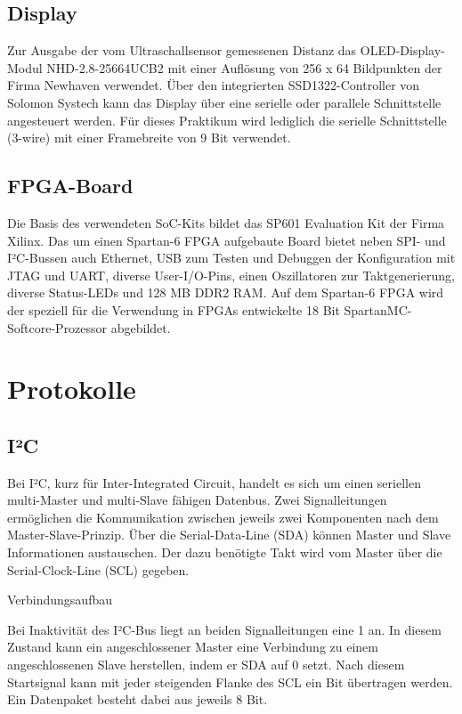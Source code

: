 \documentclass[parskip,
							 oneside,
							 11pt,
							 noheadingspace,
							 accentcolor=tud1d,
							 bigchapter,
							 colorback]{tudreport}
\begin{document}
\section{Display}
Zur Ausgabe der vom Ultraschallsensor gemessenen Distanz das OLED-Display-Modul NHD-2.8-25664UCB2 mit einer Auflösung von 256 x 64 Bildpunkten der Firma Newhaven verwendet. Über den integrierten SSD1322-Controller von Solomon Systech kann das Display über eine serielle oder parallele Schnittstelle angesteuert werden.  
Für dieses Praktikum wird lediglich die serielle Schnittstelle (3-wire) mit einer Framebreite von 9 Bit verwendet.

	\section{FPGA-Board}
Die Basis des verwendeten SoC-Kits bildet das SP601 Evaluation Kit der Firma Xilinx. Das um einen Spartan-6 FPGA aufgebaute Board bietet neben SPI- und I²C-Bussen auch Ethernet, USB zum Testen und Debuggen der Konfiguration mit JTAG und UART, diverse User-I/O-Pins, einen Oszillatoren zur Taktgenerierung, diverse Status-LEDs und 128 MB DDR2 RAM.
Auf dem Spartan-6 FPGA wird der speziell für die Verwendung in FPGAs entwickelte 18 Bit SpartanMC-Softcore-Prozessor abgebildet. 

\chapter{Protokolle}
\section{I²C}
Bei I²C, kurz für Inter-Integrated Circuit, handelt es sich um einen seriellen multi-Master und multi-Slave fähigen Datenbus. Zwei Signalleitungen ermöglichen die Kommunikation zwischen jeweils zwei Komponenten nach dem Master-Slave-Prinzip. Über die Serial-Data-Line (SDA) können Master und Slave Informationen austauschen. Der dazu benötigte Takt wird vom Master über die Serial-Clock-Line (SCL) gegeben.

Verbindungsaufbau

Bei Inaktivität des I²C-Bus liegt an beiden Signalleitungen eine 1 an. In diesem Zustand kann ein angeschlossener Master eine Verbindung zu einem angeschlossenen Slave herstellen, indem er SDA auf 0 setzt. Nach diesem Startsignal kann mit jeder steigenden Flanke des SCL ein Bit übertragen werden. Ein Datenpaket besteht dabei aus jeweils 8 Bit.
\end{document}
